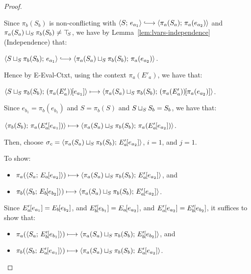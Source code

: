 \begin{proof}
\begin{itemize}
    Since $\pi_b(S_b)$ is non-conflicting with $\config{S}{e_{a_1}}
    \parstepsto \config{\pi_a(S_a)}{\pi_a(e_{a_2})}$ and
    $\pi_a(S_a) \sqcup_{S} \pi_b(S_b) \neq \top\hspace{-0.85mm}_{S}$, we have by
    Lemma~\ref{lem:lvars-independence} (Independence) that:

    $\config{\lubstore{S}{\pi_b(S_b)}}{e_{a_1}} \parstepsto
    \config{\lubstore{\pi_a(S_a)}{\pi_b(S_b)}}{\pi_a(e_{a_2})}$.

    Hence by {\sc E-Eval-Ctxt}, using the context $\pi_a(E'_a)$, we
    have that:

    $\langle S \sqcup_{S} \pi_b(S_b);\, (\pi_a(E'_a))\hspace{-1mm}\left[e_{a_1}\right] \rangle
    \longmapsto
    \langle \pi_a(S_a) \sqcup_{S} \pi_b(S_b);\, (\pi_a(E'_a))\hspace{-1mm}\left[\pi_a(e_{a_2})\right] \rangle$.

    Since $e_{b_1} = \pi_b(e_{b_1})$ and $S = \pi_b(S)$ and
    $S \sqcup_{S} S_b = S_b$, we have that:

    $\langle \pi_b(S_b);\, \pi_a(E'_a\hspace{-1mm}\left[e_{a_1}\right]) \rangle \longmapsto
    \langle \pi_a(S_a) \sqcup_{S} \pi_b(S_b);\, \pi_a(E'_a\hspace{-1mm}\left[e_{a_2}\right]) \rangle$.



    Then, choose $\sigma_c =
    \langle \pi_a(S_a) \sqcup_{S} \pi_b(S_b);\, E'_a\hspace{-1mm}\left[e_{a_2}\right] \rangle$,
    $i = 1$, and $j = 1$.

    To show:
    \begin{itemize}
    \item $\pi_a(\langle S_a;\, E_a\hspace{-1mm}\left[e_{a_2}\right] \rangle) \longmapsto
      \langle \pi_a(S_a) \sqcup_{S} \pi_b(S_b);\, E'_a\hspace{-1mm}\left[e_{a_2}\right] \rangle$,
      and
    \item $\pi_b(\langle S_b;\, E_b\hspace{-1mm}\left[e_{b_2}\right] \rangle) \longmapsto
      \langle \pi_a(S_a) \sqcup_{S} \pi_b(S_b);\, E'_a\hspace{-1mm}\left[e_{a_2}\right] \rangle$.
    \end{itemize}

    Since 
    $E'_a\hspace{-1mm}\left[e_{a_1}\right] = E_b\hspace{-1mm}\left[e_{b_2}\right]$, and
    $E'_b\hspace{-1mm}\left[e_{b_1}\right] = E_a\hspace{-1mm}\left[e_{a_2}\right]$, and
    $E'_a\hspace{-1mm}\left[e_{a_2}\right] =
    E'_b\hspace{-1mm}\left[e_{b_2}\right]$, it suffices to show that:

    \begin{itemize}
    \item $\pi_a(\langle S_a;\, E'_b\hspace{-1mm}\left[e_{b_1}\right] \rangle) \longmapsto
      \langle \pi_a(S_a) \sqcup_{S} \pi_b(S_b);\, E'_b\hspace{-1mm}\left[e_{b_2}\right] \rangle$,
      and
    \item $\pi_b(\langle S_b;\, E'_a\hspace{-1mm}\left[e_{a_1}\right] \rangle) \longmapsto
      \langle \pi_a(S_a) \sqcup_{S} \pi_b(S_b);\, E'_a\hspace{-1mm}\left[e_{a_2}\right] \rangle$.
    \end{itemize}


\end{itemize}
\end{proof}
